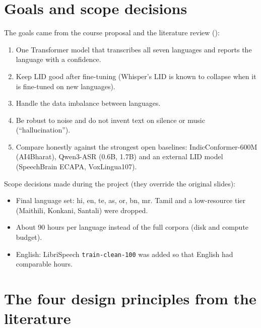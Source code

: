\section{Goals and scope decisions}

The goals came from the course proposal and the literature review ():
\begin{enumerate}
\item One Transformer model that transcribes all seven languages and reports the language with a confidence.
\item Keep LID good after fine-tuning (Whisper's LID is known to collapse when it is fine-tuned on new languages).
\item Handle the data imbalance between languages.
\item Be robust to noise and do not invent text on silence or music (``hallucination'').
\item Compare honestly against the strongest open baselines: IndicConformer-600M (AI4Bharat), Qwen3-ASR (0.6B, 1.7B) and an
external LID model (SpeechBrain ECAPA, VoxLingua107).
\end{enumerate}

Scope decisions made during the project (they override the original slides):
\begin{itemize}
\item Final language set: hi, en, te, as, or, bn, mr. Tamil and a low-resource tier (Maithili, Konkani, Santali) were dropped.
\item About 90 hours per language instead of the full corpora (disk and compute budget).
\item English: LibriSpeech \texttt{train-clean-100} was added so that English had comparable hours.
\end{itemize}

\section{The four design principles from the literature}

